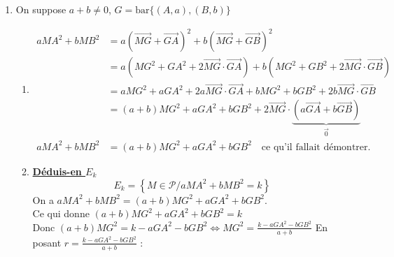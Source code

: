 \documentclass[12pt,a4paper]{article}
\begin{document}
\begin{enumerate}
\begin{enumerate}
\[
\text{Donc } \overrightarrow{IM} \cdot \overrightarrow{AB} = \frac{k}{2a}
\]  
    \item \textbf{\underline{Déduisons-en $E_k$}} \\
    $\overrightarrow{IM} \cdot \overrightarrow{AB} = \frac{k}{2a}$, soit $H \in (AB)$
    \[
    H \in E_k \iff \overrightarrow{IH} \cdot \overrightarrow{AB} = \frac{k}{2a} = \overrightarrow{IM} \cdot \overrightarrow{AB}
    \]
    Donc $\overrightarrow{IH} \cdot \overrightarrow{AB} = \overrightarrow{IM} \cdot \overrightarrow{AB}$ \\
    Ce qui donne $\overrightarrow{IM} \cdot \overrightarrow{AB} - \overrightarrow{IH} \cdot \overrightarrow{AB} = 0$
    \begin{align*}
    \overrightarrow{AB} \cdot \left(\overrightarrow{IM} - \overrightarrow{IH}\right) &= 0 \\
    \overrightarrow{AB} \cdot \overrightarrow{HM} &= 0
    \end{align*}
    D'où $E_k$ est la droite passant par $H$ et perpendiculaire à $(AB)$.
\end{enumerate}
    \item On suppose $a + b \neq 0$, $G = \text{bar}\{(A, a), (B, b)\}$
    \begin{enumerate}
    \item 
    \begin{align*}
    a MA^2 + b MB^2 &= a \left(\overrightarrow{MG} + \overrightarrow{GA}\right)^2 + b \left(\overrightarrow{MG} + \overrightarrow{GB}\right)^2 \\
    &= a \left(MG^2 + GA^2 + 2\overrightarrow{MG} \cdot \overrightarrow{GA}\right) + b \left(MG^2 + GB^2 + 2\overrightarrow{MG} \cdot \overrightarrow{GB}\right) \\
    &= a MG^2 + a GA^2 + 2a \overrightarrow{MG} \cdot \overrightarrow{GA} + b MG^2 + b GB^2 + 2b \overrightarrow{MG} \cdot \overrightarrow{GB} \\
    &= (a + b) MG^2 + a GA^2 + b GB^2 + 2\overrightarrow{MG} \cdot \underbrace{\left(a \overrightarrow{GA} + b \overrightarrow{GB}\right)}_{\vec{0}} \\
    a MA^2 + b MB^2 &= (a + b) MG^2 + a GA^2 + b GB^2 \quad \text{ce qu'il fallait démontrer.}
    \end{align*}

    \item \textbf{\underline{Déduis-en $E_k$}}
    \[
    E_k = \left\{ M \in \mathcal{P} \big/ a MA^2 + b MB^2 = k \right\}
    \]
    On a $a MA^2 + b MB^2 = (a + b) MG^2 + a GA^2 + b GB^2$. \\
    Ce qui donne $(a + b) MG^2 + a GA^2 + b GB^2 = k$ \\
    Donc $(a + b) MG^2 = k - a GA^2 - b GB^2 \iff MG^2 = \frac{k - a GA^2 - b GB^2}{a + b}$
    En posant $r = \frac{k - a GA^2 - b GB^2}{a + b}$ :


\end{enumerate}
\end{enumerate}
\end{document}
